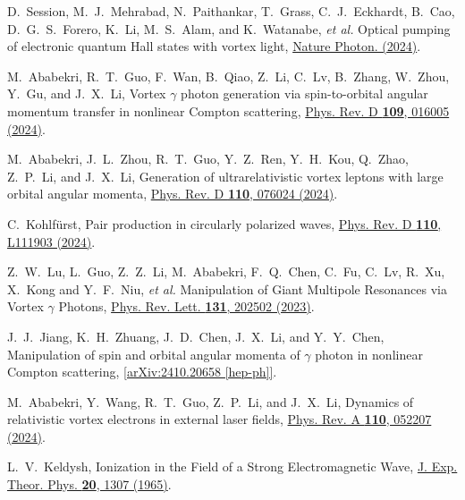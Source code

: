 \documentclass[prl,twocolumn,floatfix,amsmath,nofootinbib,superscriptaddress,amssymb,preprintnumbers,floatfix]{revtex4-1}
\begin{document}
\begin{thebibliography}{apsrev4-1}
D.~Session, M.~J.~Mehrabad, N.~Paithankar, T.~Grass, C.~J.~Eckhardt, B.~Cao, D.~G.~S.~Forero, K.~Li, M.~S.~Alam, and K.~Watanabe, \textit{et al.}
Optical pumping of electronic quantum Hall states with vortex light,
\href{https://doi.org/10.1038/s41566-024-01565-1}{Nature Photon. (2024)}.

M.~Ababekri, R.~T.~Guo, F.~Wan, B.~Qiao, Z.~Li, C.~Lv, B.~Zhang, W.~Zhou, Y.~Gu, and J.~X.~Li,
Vortex \ensuremath{\gamma} photon generation via spin-to-orbital angular momentum transfer in nonlinear Compton scattering,
\href{https://journals.aps.org/prd/pdf/10.1103/PhysRevD.109.016005}{Phys. Rev. D \textbf{109}, 016005 (2024)}.

M.~Ababekri, J.~L.~Zhou, R.~T.~Guo, Y.~Z.~Ren, Y.~H.~Kou, Q.~Zhao, Z.~P.~Li, and J.~X.~Li,
Generation of ultrarelativistic vortex leptons with large orbital angular momenta,
\href{https://journals.aps.org/prd/pdf/10.1103/PhysRevD.110.076024}{Phys. Rev. D \textbf{110}, 076024 (2024)}.

C.~Kohlf\"urst,
Pair production in circularly polarized waves,
\href{https://journals.aps.org/prd/abstract/10.1103/PhysRevD.110.L111903}{Phys. Rev. D \textbf{110}, L111903 (2024)}.

Z.~W.~Lu, L.~Guo, Z.~Z.~Li, M.~Ababekri, F.~Q.~Chen, C.~Fu, C.~Lv, R.~Xu, X.~Kong and Y.~F.~Niu, \textit{et al.}
Manipulation of Giant Multipole Resonances via Vortex \ensuremath{\gamma} Photons,
\href{https://journals.aps.org/prl/pdf/10.1103/PhysRevLett.131.202502}{Phys. Rev. Lett. \textbf{131}, 202502 (2023)}.

J.~J.~Jiang, K.~H.~Zhuang, J.~D.~Chen, J.~X.~Li, and Y.~Y.~Chen,
Manipulation of spin and orbital angular momenta of $\gamma$ photon in nonlinear Compton scattering,
\href{https://arxiv.org/pdf/2410.20658}{[arXiv:2410.20658 [hep-ph]]}.

M.~Ababekri, Y.~Wang, R.~T.~Guo, Z.~P.~Li, and J.~X.~Li,
Dynamics of relativistic vortex electrons in external laser fields,
\href{https://journals.aps.org/pra/pdf/10.1103/PhysRevA.110.052207}{Phys. Rev. A \textbf{110}, 052207 (2024)}.

L.~V.~Keldysh,
Ionization in the Field of a Strong Electromagnetic Wave,
\href{https://inspirehep.net/files/6697e05d52e411291acc8238a780db45}{J. Exp. Theor. Phys. \textbf{20}, 1307 (1965)}.


\end{thebibliography}
\end{document}
